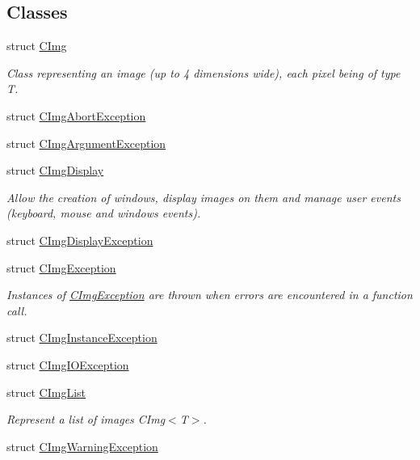 \subsection*{Classes}
\begin{DoxyCompactItemize}
\item 
struct \hyperlink{structcimg__library__suffixed_1_1CImg}{C\+Img}
\begin{DoxyCompactList}\small\item\em Class representing an image (up to 4 dimensions wide), each pixel being of type {\ttfamily T}. \end{DoxyCompactList}\item 
struct \hyperlink{structcimg__library__suffixed_1_1CImgAbortException}{C\+Img\+Abort\+Exception}
\item 
struct \hyperlink{structcimg__library__suffixed_1_1CImgArgumentException}{C\+Img\+Argument\+Exception}
\item 
struct \hyperlink{structcimg__library__suffixed_1_1CImgDisplay}{C\+Img\+Display}
\begin{DoxyCompactList}\small\item\em Allow the creation of windows, display images on them and manage user events (keyboard, mouse and windows events). \end{DoxyCompactList}\item 
struct \hyperlink{structcimg__library__suffixed_1_1CImgDisplayException}{C\+Img\+Display\+Exception}
\item 
struct \hyperlink{structcimg__library__suffixed_1_1CImgException}{C\+Img\+Exception}
\begin{DoxyCompactList}\small\item\em Instances of {\ttfamily \hyperlink{structcimg__library__suffixed_1_1CImgException}{C\+Img\+Exception}} are thrown when errors are encountered in a  function call. \end{DoxyCompactList}\item 
struct \hyperlink{structcimg__library__suffixed_1_1CImgInstanceException}{C\+Img\+Instance\+Exception}
\item 
struct \hyperlink{structcimg__library__suffixed_1_1CImgIOException}{C\+Img\+I\+O\+Exception}
\item 
struct \hyperlink{structcimg__library__suffixed_1_1CImgList}{C\+Img\+List}
\begin{DoxyCompactList}\small\item\em Represent a list of images C\+Img$<$\+T$>$. \end{DoxyCompactList}\item 
struct \hyperlink{structcimg__library__suffixed_1_1CImgWarningException}{C\+Img\+Warning\+Exception}
\end{DoxyCompactItemize}
